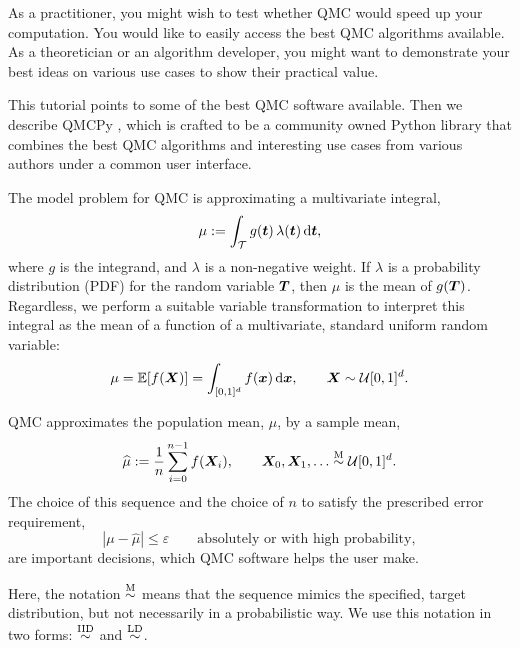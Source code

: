 \documentclass[graybox,footinfo]{svmult}
\newcommand{\QMCPYabs}[1]{\ensuremath{{\left \lvert #1 \right \rvert}}}
\newcommand{\hmu}{\widehat{\mu}}
\newcommand{\IID}{\textup{IID}}
\newcommand{\LD}{\textup{LD}}
\newcommand{\IIDsim}{\overset{\IID}{\sim}}
\newcommand{\LDsim}{\overset{\LD}{\sim}}
\newcommand{\Msim}{\overset{\textup{M}}{\sim}}
\newcommand{\cube}{[0,1]^d}
\begin{document}
As a practitioner, you might wish to test whether QMC would speed up your computation.  You would like to easily access the best QMC algorithms available.  As a theoretician or an algorithm developer, you might want to demonstrate your best ideas on  various  use cases to show their practical value.  

This tutorial points to some of the best QMC software available.  Then we describe  QMCPy \cite{QMCPy2020a}, which is crafted to be a community owned Python library that combines the best QMC algorithms and interesting use cases from various authors under a common user interface.

The model problem for QMC is approximating a multivariate integral,
\begin{equation} \label{eq:integral}
	\mu := \int_\calT g(\bst) \, \lambda(\bst) \, \D \bst,
\end{equation}
where $g$ is the integrand, and $\lambda$ is a non-negative weight.  If $\lambda$ is a probability distribution (PDF) for the random variable ${\boldsymbol{T}}$, then $\mu$ is the mean of $g({\boldsymbol{T}})$.  Regardless, we perform a suitable variable transformation to interpret this integral as the  mean of a function of a multivariate, standard uniform random variable:
\begin{equation} \label{eq:fintegral}
	\mu = \bbE[f(\bsX)] =  \int_{\cube}  f(\bsx) \,  \D \bsx , \qquad \bsX \sim \calU\cube.
\end{equation}

QMC approximates the population mean, $\mu$,  by a sample mean,
\begin{equation} \label{eq:samplemean}
	\hmu := \frac 1n \sum_{i=0}^{n-1} f(\bsX_i), \qquad \bsX_0, \bsX_1, \ldots \Msim \calU\cube.
\end{equation}
The choice of this sequence and the choice of $n$ to satisfy  the prescribed error requirement,
\begin{equation} \label{eq:err_req}
	\QMCPYabs{\mu - \hmu} \le \varepsilon \qquad \text{absolutely or with high probability},
\end{equation} 
are important decisions, which  QMC software helps the user make.

Here, the notation $\Msim$ means that the sequence mimics the specified, target distribution, but not necessarily in a probabilistic way.  We  use this notation in two forms:  $\IIDsim$ and $\LDsim$.
\end{document}
